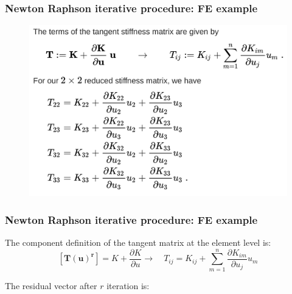 \documentclass[notes]{beamer}
\begin{document}
\begin{frame}
\frametitle{Newton Raphson iterative procedure: FE example}
\begin{figure}[ht]
	\centering
	\includegraphics[width=\textwidth]{figs/tangent-matrix.png}
\end{figure}
\end{frame}


\begin{frame}
\frametitle{Newton Raphson iterative procedure: FE example}
The component definition of the tangent matrix at the element level is:
	\begin{equation*}
		\left[\mathbf{T({u})^r}\right] = K + \frac{\partial K}{\partial u} \rightarrow 
		\quad T_{ij} = K_{ij} + \sum_{m = 1}^n \frac{\partial K_{im}}{\partial u_j}u_m
	\end{equation*}

The residual vector after $r$ iteration is:
\end{frame}
\end{document}
